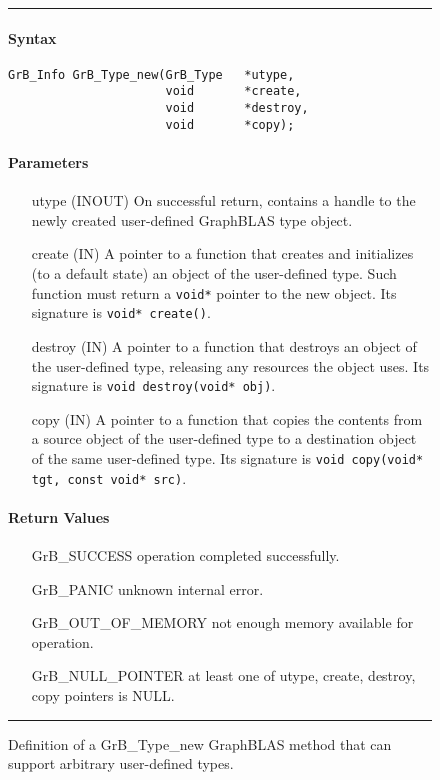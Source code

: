 \begin{figure}
	\hrule
\paragraph{Syntax}

\begin{verbatim}
GrB_Info GrB_Type_new(GrB_Type   *utype,
                      void       *create,
                      void       *destroy,
                      void       *copy);
\end{verbatim}

\paragraph{Parameters}

\begin{itemize}[leftmargin=0.6in]
\item[{\sf utype}] ({\sf INOUT}) On successful return, contains a handle to the newly created user-defined GraphBLAS type object.
\item[{\sf create}] ({\sf IN})    A pointer to a function that creates and initializes (to a default state) an object of the user-defined type. Such function must return a {\tt void*} pointer to the new object. Its signature is \verb|void* create()|.
\item[{\sf destroy}] ({\sf IN}) A pointer to a function that destroys an object of the user-defined type, releasing any resources the object uses. Its signature is \verb|void destroy(void* obj)|.
\item[{\sf copy}] ({\sf IN}) A pointer to a function that copies the contents from a source object of the user-defined type to a destination object of the same user-defined type. Its signature is \verb|void copy(void* tgt, const void* src)|.
\end{itemize}

\paragraph{Return Values}

\begin{itemize}[leftmargin=1.6in]
\item[{\sf GrB\_SUCCESS}]           operation completed successfully.
\item[{\sf GrB\_PANIC}]             unknown internal error.
\item[{\sf GrB\_OUT\_OF\_MEMORY}]          not enough memory available for operation.
\item[{\sf GrB\_NULL\_POINTER}]    at least one of {\sf utype}, {\sf create}, {\sf destroy}, {\sf copy} pointers is {\sf NULL}.
\end{itemize}

	\caption{Definition of a {\sf GrB\_Type\_new} GraphBLAS method that can support arbitrary user-defined types.}
	\label{Fig:GrB_Type_new}
\hrule
\end{figure}
